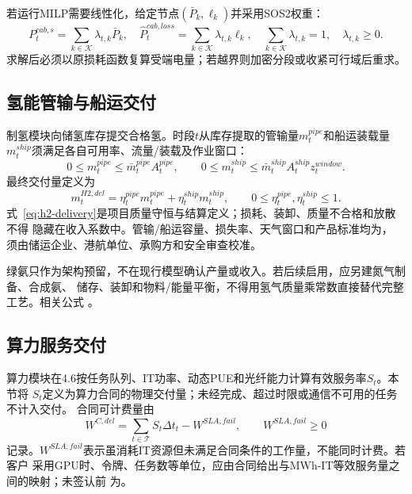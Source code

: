 若运行MILP需要线性化，给定节点$(\bar P_k,\ell_k)$并采用SOS2权重：
\begin{equation}
P_t^{cab,s}=\sum_{k\in\mathcal K}\lambda_{t,k}\bar P_k,
\quad
\widehat P_t^{cab,loss}=\sum_{k\in\mathcal K}\lambda_{t,k}\ell_k,
\quad
\sum_{k\in\mathcal K}\lambda_{t,k}=1,
\quad \lambda_{t,k}\ge0.
\label{eq:cable-loss-pwl}
\end{equation}
求解后必须以原损耗函数复算受端电量；若越界则加密分段或收紧可行域后重求。

\subsection{氢能管输与船运交付}

制氢模块向储氢库存提交合格氢。时段$t$从库存提取的管输量$m_t^{pipe}$和船运装载量
$m_t^{ship}$须满足各自可用率、流量/装载及作业窗口：
\begin{equation}
0\le m_t^{pipe}\le \bar m_t^{pipe}A_t^{pipe},
\qquad
0\le m_t^{ship}\le \bar m_t^{ship}A_t^{ship}z_t^{window}.
\label{eq:h2-channel-capacity}
\end{equation}
最终交付量定义为
\begin{equation}
m_t^{H2,del}
=\eta_t^{pipe}m_t^{pipe}+\eta_t^{ship}m_t^{ship},
\qquad 0\le\eta_t^{pipe},\eta_t^{ship}\le1.
\label{eq:h2-delivery}
\end{equation}
式~\eqref{eq:h2-delivery}是项目质量守恒与结算定义；损耗、装卸、质量不合格和放散不得
隐藏在收入系数中。管输/船运容量、损失率、天气窗口和产品标准均为\assumptiontag，
须由储运企业、港航单位、承购方和安全审查校准。

绿氨只作为架构预留，不在现行模型确认产量或收入。若后续启用，应另建氮气制备、合成氨、
储存、装卸和物料/能量平衡，不得用氢气质量乘常数直接替代完整工艺。相关公式
\verifytag。

\subsection{算力服务交付}

算力模块在4.6按任务队列、IT功率、动态PUE和光纤能力计算有效服务率$S_t$。本节将
$S_t$定义为算力合同的物理交付量；未经完成、超过时限或通信不可用的任务不计入交付。
合同可计费量由
\begin{equation}
W^{C,del}=\sum_{t\in\mathcal T} S_t\Delta t_t-W^{SLA,fail},
\qquad W^{SLA,fail}\ge0
\label{eq:compute-delivery}
\end{equation}
记录。$W^{SLA,fail}$表示虽消耗IT资源但未满足合同条件的工作量，不能同时计费。若客户
采用GPU时、令牌、任务数等单位，应由合同给出与MWh-IT等效服务量之间的映射；未签认前
为\assumptiontag。

